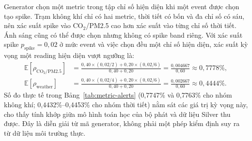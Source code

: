 Generator chọn một metric trong tập chỉ số hiện diện khi một event được chọn tạo spike. Trạm không khí chỉ có hai metric, thời tiết có bốn và đa chỉ số có sáu, nên xác suất spike vào CO$_2$/PM2.5 cao hơn xác suất vào từng chỉ số thời tiết. Ánh sáng cũng có thể được chọn nhưng không có spike band riêng. Với xác suất spike $p_{\mathrm{spike}}=0{,}02$ ở mức event và việc chọn đều một chỉ số hiện diện, xác suất kỳ vọng một reading hiện diện vượt ngưỡng là:
\begin{align}
\mathbb{E}[\rho_{\mathrm{CO_2/PM2.5}}]
  &= \frac{0{,}40 \times (0{,}02/2) + 0{,}20 \times (0{,}02/6)}{0{,}40 + 0{,}20}
   = \frac{0{,}004667}{0{,}60} \approx 0{,}7778\%, \label{eq:spike-air}\\
\mathbb{E}[\rho_{\mathrm{weather}}]
  &= \frac{0{,}40 \times (0{,}02/4) + 0{,}20 \times (0{,}02/6)}{0{,}40 + 0{,}20}
   = \frac{0{,}002667}{0{,}60} \approx 0{,}4444\%. \label{eq:spike-weather}
\end{align}
Số đo thực tế trong Bảng~\ref{tab:metric-alerts} (0{,}7747\% và 0{,}7763\% cho nhóm không khí; 0{,}4432\%--0{,}4453\% cho nhóm thời tiết) nằm sát các giá trị kỳ vọng này, cho thấy tính khớp giữa mô hình toán học của bộ phát và dữ liệu Silver thu được. Đây là diễn giải từ mã generator, không phải một phép kiểm định suy ra từ dữ liệu môi trường thực.

